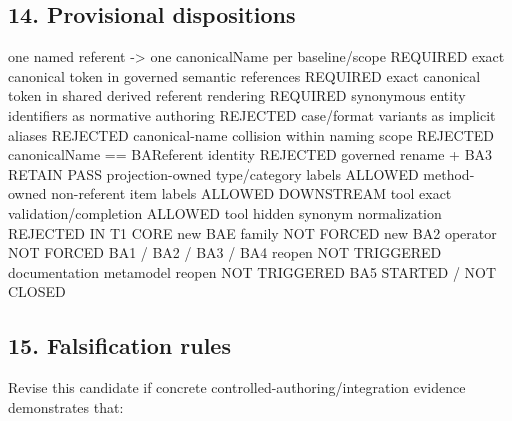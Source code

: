 \documentclass[
  10pt,
  a4paper,
]{article}
\newenvironment{Shaded}{}{}
\newcommand{\NormalTok}[1]{#1}
\begin{document}
\subsection{14. Provisional
dispositions}\label{provisional-dispositions}

\begin{Shaded}
\begin{Highlighting}[]
\NormalTok{one named referent {-}\textgreater{} one canonicalName per baseline/scope       REQUIRED}
\NormalTok{exact canonical token in governed semantic references           REQUIRED}
\NormalTok{exact canonical token in shared derived referent rendering      REQUIRED}
\NormalTok{synonymous entity identifiers as normative authoring             REJECTED}
\NormalTok{case/format variants as implicit aliases                         REJECTED}
\NormalTok{canonical{-}name collision within naming scope                     REJECTED}
\NormalTok{canonicalName == BAReferent identity                              REJECTED}
\NormalTok{governed rename + BA3 RETAIN                                     PASS}
\NormalTok{projection{-}owned type/category labels                            ALLOWED}
\NormalTok{method{-}owned non{-}referent item labels                            ALLOWED DOWNSTREAM}
\NormalTok{tool exact validation/completion                                 ALLOWED}
\NormalTok{tool hidden synonym normalization                                REJECTED IN T1 CORE}
\NormalTok{new BAE family                                                   NOT FORCED}
\NormalTok{new BA2 operator                                                 NOT FORCED}
\NormalTok{BA1 / BA2 / BA3 / BA4 reopen                                    NOT TRIGGERED}
\NormalTok{documentation metamodel reopen                                   NOT TRIGGERED}
\NormalTok{BA5                                                              STARTED / NOT CLOSED}
\end{Highlighting}
\end{Shaded}

\subsection{15. Falsification rules}\label{falsification-rules}

Revise this candidate if concrete controlled-authoring/integration
evidence demonstrates that:
\end{document}
